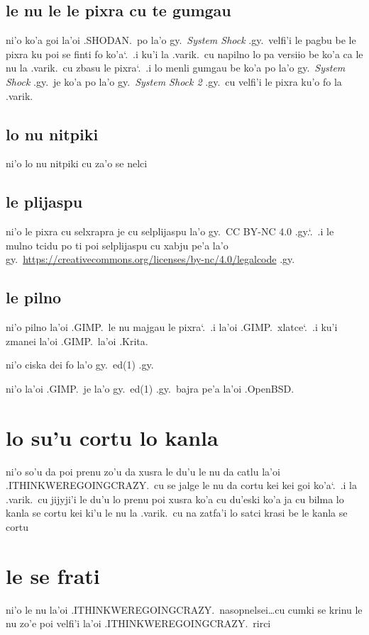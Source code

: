 \documentclass{report}
\newcommand\sds{\spacefactor\sfcode`.\ \space}
\begin{document}
\subsection{le nu le le pixra cu te gumgau}
ni'o ko'a goi la'oi .SHODAN.\ po la'o gy.\ \textit{System Shock} .gy.\ velfi'i le pagbu be le pixra ku poi se finti fo ko'a\sds  .i ku'i la .varik.\ cu napilno lo pa versiio be ko'a ca le nu la .varik.\ cu zbasu le pixra\sds  .i lo menli gumgau be ko'a po la'o gy.\ \textit{System Shock} .gy.\ je ko'a po la'o gy.\ \textit{System Shock 2} .gy.\ cu velfi'i le pixra ku'o fo la .varik.
\subsection{lo nu nitpiki}
ni'o lo nu nitpiki cu za'o se nelci

\subsection{le plijaspu}
ni'o le pixra cu selxrapra je cu selplijaspu la'o gy.\ CC BY-NC 4.0 .gy.\sds  .i le mulno tcidu po ti poi selplijaspu cu xabju pe'a la'o gy.\ \url{https://creativecommons.org/licenses/by-nc/4.0/legalcode} .gy.

\subsection{le pilno}
ni'o pilno la'oi .GIMP.\ le nu majgau le pixra\sds  .i  la'oi .GIMP.\ xlatce\sds  .i ku'i zmanei la'oi .GIMP.\ la'oi .Krita.

ni'o ciska dei fo la'o gy.\ ed(1) .gy.

ni'o la'oi .GIMP.\ je la'o gy.\ ed(1) .gy.\ bajra pe'a la'oi .OpenBSD.

\section{lo su'u cortu lo kanla}
ni'o so'u da poi prenu zo'u da xusra le du'u le nu da catlu la'oi .ITHINKWEREGOINGCRAZY.\ cu se jalge le nu da cortu kei kei goi ko'a\sds  .i la .varik.\ cu jijyji'i le du'u lo prenu poi xusra ko'a cu du'eski ko'a ja cu bilma lo kanla se cortu kei ki'u le nu la .varik.\ cu na zatfa'i lo satci krasi be le kanla se cortu

\section{le se frati}
ni'o le nu la'oi .ITHINKWEREGOINGCRAZY.\ nasopnelsei\ldots cu cumki se krinu le nu zo'e poi velfi'i la'oi .ITHINKWEREGOINGCRAZY.\ rirci
\end{document}
